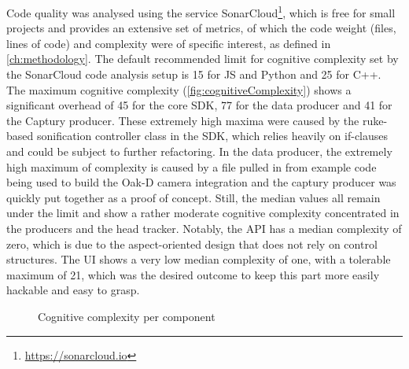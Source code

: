 Code quality was analysed using the service SonarCloud\footnote{\url{https://sonarcloud.io}}, which is free for small projects and provides an extensive set of metrics, of which the code weight (files, lines of code) and complexity were of specific interest, as defined in \autoref{ch:methodology}.
The default recommended limit for cognitive complexity set by the SonarCloud code analysis setup is 15 for \ac{JS} and Python and 25 for C++.
The maximum cognitive complexity (\autoref{fig:cognitiveComplexity}) shows a significant overhead of 45 for the core \ac{SDK}, 77 for the data producer and 41 for the Captury producer.
These extremely high maxima were caused by the ruke-based sonification controller class in the \ac{SDK}, which relies heavily on if-clauses and could be subject to further refactoring.
In the data producer, the extremely high maximum of complexity is caused by a file pulled in from example code being used to build the Oak-D camera integration and the captury producer was quickly put together as a proof of concept.
Still, the median values all remain under the limit and show a rather moderate cognitive complexity concentrated in the producers and the head tracker.
Notably, the \ac{API} has a median complexity of zero, which is due to the aspect-oriented design that does not rely on control structures.
The \ac{UI} shows a very low median complexity of one, with a tolerable maximum of 21, which was the desired outcome to keep this part more easily hackable and easy to grasp.

\begin{figure}[!ht]
\centering

\caption[Cognitive complexity]{Cognitive complexity per component\protect}
\label{fig:cognitiveComplexity}
\end{figure}

